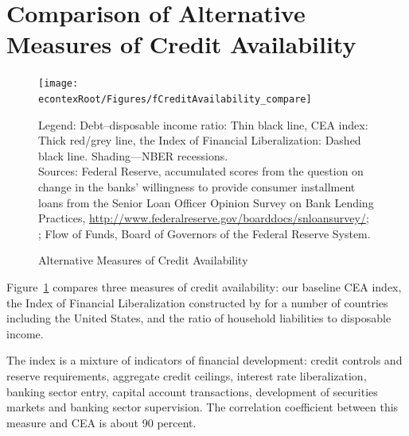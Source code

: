 \documentclass[titlepage]{\econtex}
\begin{document}
\small

\clearpage\pagebreak






\clearpage



\clearpage
\appendix




\section{Comparison of Alternative Measures of Credit Availability}


\hypertarget{fCreditAvailability}{}
\begin{figure}
\caption{Alternative Measures of Credit Availability \label{fCreditAvailability}}
\texttt{[image: \\econtexRoot/Figures/fCreditAvailability\_compare]}

\footnotesize
Legend: Debt--disposable income ratio: Thin black line, CEA index: Thick red/grey line, the \cite{abiadEtAl_FinReforms} Index of Financial Liberalization: Dashed black line. Shading---NBER recessions.\\[0mm]
\tiny Sources: Federal Reserve, accumulated scores from the question on change in the banks' willingness to provide consumer installment loans from the Senior Loan Officer Opinion Survey on Bank Lending Practices, \url{http://www.federalreserve.gov/boarddocs/snloansurvey/}; \cite{abiadEtAl_FinReforms}; Flow of Funds, Board of Governors of the Federal Reserve System.
\end{figure}

Figure~\ref{fCreditAvailability} compares three measures of credit availability: our baseline CEA index, the Index of Financial Liberalization constructed by \cite{abiadEtAl_FinReforms} for a number of countries including the United States, and the ratio of household liabilities to disposable income.

The \citeauthor{abiadEtAl_FinReforms} index is a mixture of indicators of financial development: credit controls and reserve requirements, aggregate credit ceilings, interest rate liberalization, banking sector entry, capital account transactions, development of securities markets and banking sector supervision. The correlation coefficient between this measure and CEA is about 90 percent.
\end{document}
